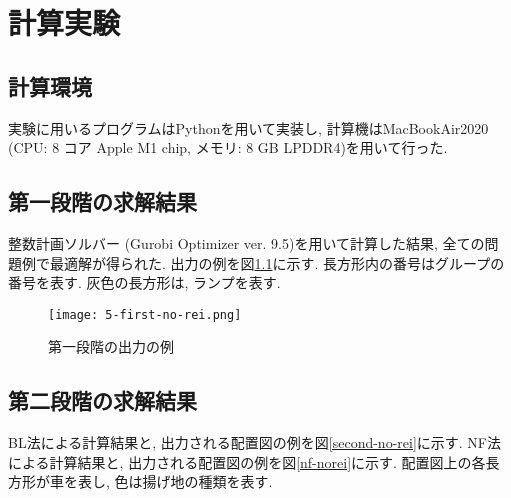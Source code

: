 \chapter{計算実験}\label{computational_result}
\section{計算環境}
実験に用いるプログラムはPythonを用いて実装し, 計算機はMacBookAir2020 (CPU: 8 コア Apple M1 chip, メモリ: 8 GB LPDDR4)を用いて行った. 

\section{第一段階の求解結果}
整数計画ソルバー (Gurobi Optimizer ver. 9.5)を用いて計算した結果, 全ての問題例で最適解が得られた. 
出力の例を図\ref{first-no-rei}に示す. 
長方形内の番号はグループの番号を表す. 
灰色の長方形は, ランプを表す. \\

\begin{figure}[b]
    \texttt{[image: 5-first-no-rei.png]}
    \caption{第一段階の出力の例}
    \label{first-no-rei}
\end{figure}
\clearpage


\section{第二段階の求解結果}
BL法による計算結果と, 出力される配置図の例を図\ref{second-no-rei}に示す. 
NF法による計算結果と, 出力される配置図の例を図\ref{nf-norei}に示す. 
配置図上の各長方形が車を表し, 色は揚げ地の種類を表す. \\

